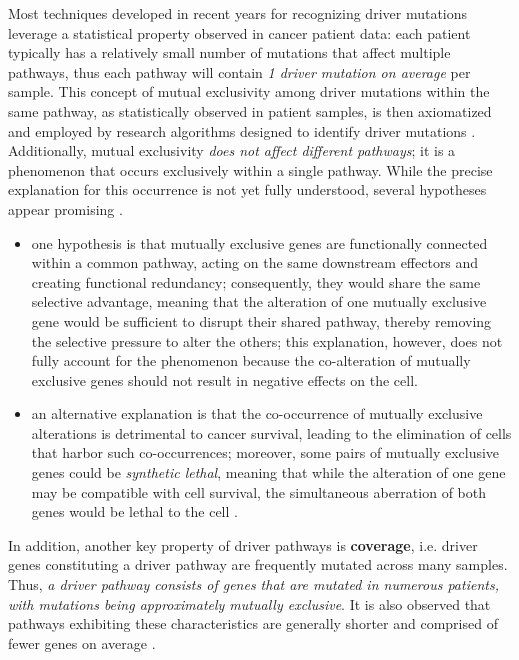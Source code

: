 Most techniques developed in recent years for recognizing driver mutations leverage a statistical property observed in cancer patient data: each patient typically has a relatively small number of mutations that affect multiple pathways, thus each pathway will contain \textit{1 driver mutation on average} per sample. This concept of mutual exclusivity among driver mutations within the same pathway, as statistically observed in patient samples, is then axiomatized and employed by research algorithms designed to identify driver mutations \cite{multi-dendrix}. Additionally, mutual exclusivity \textit{does not affect different pathways}; it is a phenomenon that occurs exclusively within a single pathway. While the precise explanation for this occurrence is not yet fully understood, several hypotheses appear promising \cite{survey, mutual_exclusivity_expls}.

\begin{itemize}
    \item one hypothesis is that mutually exclusive genes are functionally connected within a common pathway, acting on the same downstream effectors and creating functional redundancy; consequently, they would share the same selective advantage, meaning that the alteration of one mutually exclusive gene would be sufficient to disrupt their shared pathway, thereby removing the selective pressure to alter the others; this explanation, however, does not fully account for the phenomenon because the co-alteration of mutually exclusive genes should not result in negative effects on the cell.
    \item an alternative explanation is that the co-occurrence of mutually exclusive alterations is detrimental to cancer survival, leading to the elimination of cells that harbor such co-occurrences; moreover, some pairs of mutually exclusive genes could be \textit{synthetic lethal}, meaning that while the alteration of one gene may be compatible with cell survival, the simultaneous aberration of both genes would be lethal to the cell .
\end{itemize}

In addition, another key property of driver pathways is \textbf{coverage}, i.e. driver genes constituting a driver pathway are frequently mutated across many samples. Thus, \textit{a driver pathway consists of genes that are mutated in numerous patients, with mutations being approximately mutually exclusive}. It is also observed that pathways exhibiting these characteristics are generally shorter and comprised of fewer genes on average \cite{multi-dendrix}.

